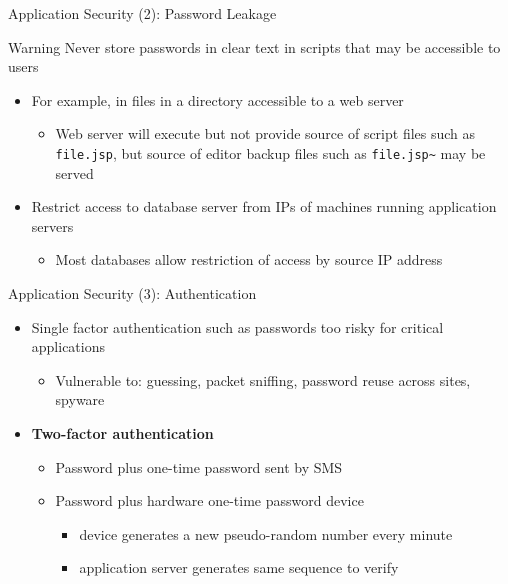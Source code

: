 \documentclass[aspectratio=169, xcolor=dvipsnames]{beamer}
\begin{document}
\begin{frame}{Application Security (2): Password Leakage}
    \begin{alertblock}{Warning}
        Never store passwords in clear text in scripts that may be accessible to users
    \end{alertblock}
    \begin{itemize}[<+->]
        \item For example, in files in a directory accessible to a web server
        \begin{itemize}
            \item[$\triangleright$] Web server will execute but not provide source of script files such as \texttt{file.jsp}, but source of editor backup files such as \texttt{file.jsp\~{}} may be served
        \end{itemize}
        \item Restrict access to database server from IPs of machines running application servers
        \begin{itemize}
            \item[$\triangleright$] Most databases allow restriction of access by source IP address
        \end{itemize}
    \end{itemize}
\end{frame}

\begin{frame}{Application Security (3): Authentication}
    \begin{itemize}[<+->]
        \item Single factor authentication such as passwords too risky for critical applications
        \begin{itemize}
            \item[$\triangleright$] Vulnerable to: guessing, packet sniffing, password reuse across sites, spyware
        \end{itemize}
        \item \textbf{Two-factor authentication}
        \begin{itemize}
            \item[$\triangleright$] Password plus one-time password sent by SMS
            \item[$\triangleright$] Password plus hardware one-time password device
            \begin{itemize}
                \item device generates a new pseudo-random number every minute
                \item application server generates same sequence to verify
            \end{itemize}
        \end{itemize}
    \end{itemize}
\end{frame}
\end{document}
